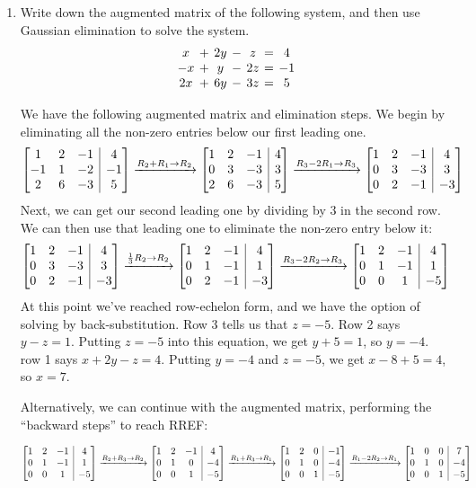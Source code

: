 \documentclass[12pt]{article}
\makeatletter
\newenvironment{amatrix}[1]{%
  \left[\begin{array}{@{}*{#1}{c}|c@{}}
}{%
  \end{array}\right]
}
\newcommand{\bam}{\begin{amatrix}}
\newcommand{\eam}{\end{amatrix}}
\makeatother
\begin{document}
\begin{enumerate}
\begin{enumerate}
\end{enumerate}


\pagebreak

\item Write down the augmented matrix of the following system, and then use Gaussian elimination to solve the system.
\[
 \arraycolsep=2pt \begin{array}{ccccccc}
                  x&+&2y&-&z&=&4\\-x&+&y&-&2z&=&-1\\ 2x&+&6y&-&3z&=&5
                  \end{array}
\]

We have the following augmented matrix and elimination steps. We begin by eliminating all the non-zero entries below our first leading one.
\[
\bam{3}
1&2&-1&4\\
-1&1&-2&-1\\
2&6&-3&5
\eam  \xrightarrow[]{R_2+R_1\to R_2}
\bam{3}
 1&2&-1&4\\
 0&3&-3&3\\
 2&6&-3&5
\eam
 \xrightarrow[]{R_3-2R_1\to R_3} 
\bam{3}
 1&2&-1&4\\
 0&3&-3&3\\
 0&2&-1&-3
\eam
\]
Next, we can get our second leading one by dividing by 3 in the second row. We can then use that leading one to eliminate the non-zero entry below it:
\[
\bam{3}
 1&2&-1&4\\
 0&3&-3&3\\
 0&2&-1&-3
\eam
\xrightarrow[]{\frac13 R_2\to R_2}
\bam{3}
 1&2&-1&4\\
 0&1&-1&1\\
 0&2&-1&-3
\eam 
\xrightarrow[]{R_3-2R_2\to R_3}
\bam{3}
 1&2&-1&4\\
 0&1&-1&1\\
 0&0&1&-5
\eam
\]
At this point we've reached row-echelon form, and we have the option of solving by back-substitution. Row 3 tells us that $z=-5$. Row 2 says $y-z=1$. Putting $z=-5$ into this equation, we get $y+5=1$, so $y=-4$. row 1 says $x+2y-z=4$. Putting $y=-4$ and $z=-5$, we get $x-8+5=4$, so $x=7$.



Alternatively, we can continue with the augmented matrix, performing the ``backward steps'' to reach RREF:

\noindent\hskip -60pt
\noindent\begin{minipage}{1.2\textwidth}
\[
\bam{3}
 1&2&-1&4\\
 0&1&-1&1\\
 0&0&1&-5
\eam  \xrightarrow[]{R_2+R_3\to R_2} 
\bam{3}
 1&2&-1&4\\
 0&1&0&-4\\
 0&0&1&-5
\eam
\xrightarrow[]{R_1+R_3\to R_1} 
\bam{3}
 1&2&0&-1\\
 0&1&0&-4\\
 0&0&1&-5
\eam
\xrightarrow[]{R_1-2R_2\to R_1}
\bam{3}
 1&0&0&7\\
 0&1&0&-4\\
 0&0&1&-5
\eam 
\]
\end{minipage}


\end{enumerate}
\end{document}
